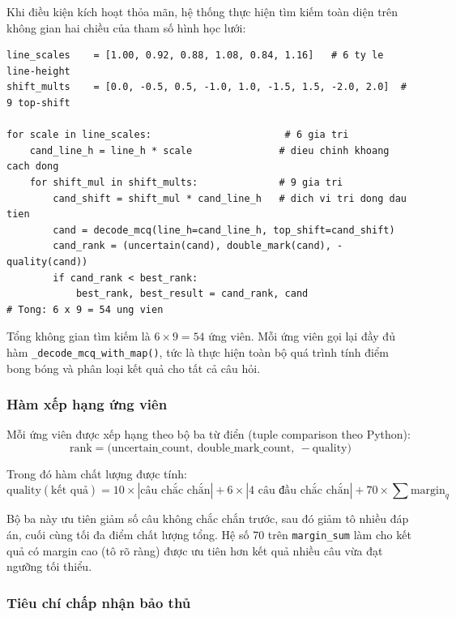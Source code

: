 Khi điều kiện kích hoạt thỏa mãn, hệ thống thực hiện tìm kiếm toàn diện trên không gian hai chiều của tham số hình học lưới:

\begin{lstlisting}[caption={Không gian tìm kiếm MCQ Map Search Rescue}, label={lst:rescue}, basicstyle=\ttfamily\small, breaklines=true, frame=single, showstringspaces=false]
line_scales    = [1.00, 0.92, 0.88, 1.08, 0.84, 1.16]   # 6 ty le line-height
shift_mults    = [0.0, -0.5, 0.5, -1.0, 1.0, -1.5, 1.5, -2.0, 2.0]  # 9 top-shift

for scale in line_scales:                       # 6 gia tri
    cand_line_h = line_h * scale               # dieu chinh khoang cach dong
    for shift_mul in shift_mults:              # 9 gia tri
        cand_shift = shift_mul * cand_line_h   # dich vi tri dong dau tien
        cand = decode_mcq(line_h=cand_line_h, top_shift=cand_shift)
        cand_rank = (uncertain(cand), double_mark(cand), -quality(cand))
        if cand_rank < best_rank:
            best_rank, best_result = cand_rank, cand
# Tong: 6 x 9 = 54 ung vien
\end{lstlisting}

Tổng không gian tìm kiếm là $6 \times 9 = 54$ ứng viên. Mỗi ứng viên gọi lại đầy đủ hàm \texttt{\_decode\_mcq\_with\_map()}, tức là thực hiện toàn bộ quá trình tính điểm bong bóng và phân loại kết quả cho tất cả câu hỏi.

\subsubsection*{Hàm xếp hạng ứng viên}

Mỗi ứng viên được xếp hạng theo bộ ba từ điển (tuple comparison theo Python):
$$\text{rank} = \bigl(\text{uncertain\_count},\ \text{double\_mark\_count},\ -\text{quality}\bigr)$$

Trong đó hàm chất lượng được tính:
$$\text{quality}(\text{kết quả}) = 10 \times |\text{câu chắc chắn}| + 6 \times |\text{4 câu đầu chắc chắn}| + 70 \times \sum \text{margin}_q$$

Bộ ba này ưu tiên giảm số câu không chắc chắn trước, sau đó giảm tô nhiều đáp án, cuối cùng tối đa điểm chất lượng tổng. Hệ số 70 trên \texttt{margin\_sum} làm cho kết quả có margin cao (tô rõ ràng) được ưu tiên hơn kết quả nhiều câu vừa đạt ngưỡng tối thiểu.

\subsubsection*{Tiêu chí chấp nhận bảo thủ}

